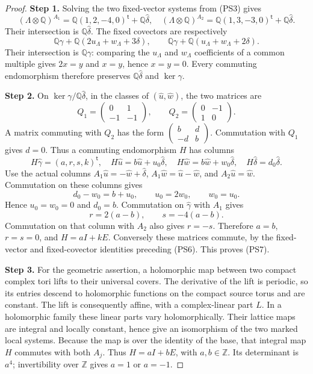 \begin{proof}
\par\smallskip\noindent\textbf{Step 1.} Solving the two fixed-vector systems from (PS3) gives
\[
 (\Lambda\otimes\mathbb Q)^{A_1}
   =\mathbb Q(1,2,-4,0)^{\mathsf t}+\mathbb Q\widehat\delta,
 \quad
 (\Lambda\otimes\mathbb Q)^{A_2}
   =\mathbb Q(1,3,-3,0)^{\mathsf t}+\mathbb Q\widehat\delta.
\]
Their intersection is $\mathbb Q\widehat\delta$. The fixed covectors
are respectively
\[
 \mathbb Q\gamma+\mathbb Q(2u_{\Lambda}+w_{\Lambda}+3\delta),\qquad
 \mathbb Q\gamma+\mathbb Q(u_{\Lambda}+w_{\Lambda}+2\delta).
\]
Their intersection is $\mathbb Q\gamma$: comparing the $u_{\Lambda}$ and $w_{\Lambda}$
coefficients of a common multiple gives $2x=y$ and $x=y$, hence
$x=y=0$. Every commuting endomorphism therefore preserves
$\mathbb Q\widehat\delta$ and $\ker\gamma$.

\par\smallskip\noindent\textbf{Step 2.} On $\ker\gamma/\mathbb Q\widehat\delta$, in the classes of
$(\widehat u,\widehat w)$, the two matrices are
\[
 Q_1=\begin{pmatrix}0&1\\-1&-1\end{pmatrix},\qquad
 Q_2=\begin{pmatrix}0&-1\\1&0\end{pmatrix}.
\]
A matrix commuting with $Q_2$ has the form
$\left(\begin{smallmatrix}b&d\\-d&b\end{smallmatrix}\right)$.
Commutation with $Q_1$ gives $d=0$. Thus a commuting endomorphism $H$
has columns
\[
 H\widehat\gamma=(a,r,s,k)^{\mathsf t},\quad
 H\widehat u=b\widehat u+u_0\widehat\delta,\quad
 H\widehat w=b\widehat w+w_0\widehat\delta,\quad
 H\widehat\delta=d_0\widehat\delta.
\]
Use the actual columns $A_1\widehat u=-\widehat w+\widehat\delta$,
$A_1\widehat w=\widehat u-\widehat w$, and
$A_2\widehat u=\widehat w$. Commutation on these columns gives
\[
 d_0-w_0=b+u_0,\qquad u_0=2w_0,\qquad w_0=u_0.
\]
Hence $u_0=w_0=0$ and $d_0=b$. Commutation on
$\widehat\gamma$ with $A_1$ gives
\[
 r=2(a-b),\qquad s=-4(a-b).
\]
Commutation on that column with $A_2$ also gives $r=-s$.
Therefore $a=b$, $r=s=0$, and $H=aI+kE$. Conversely these matrices
commute, by the fixed-vector and fixed-covector identities preceding
(PS6). This proves (PS7).

\par\smallskip\noindent\textbf{Step 3.} For the geometric assertion, a holomorphic map between two compact
complex tori lifts to their universal covers. The derivative of the
lift is periodic, so its entries descend to holomorphic functions on
the compact source torus and are constant. The lift is consequently
affine, with a complex-linear part $L$. In a holomorphic family these
linear parts vary holomorphically. Their lattice maps are integral
and locally constant, hence give an isomorphism of the two marked
local systems. Because the map is over the identity of the base,
that integral map $H$ commutes with both $A_j$. Thus
$H=aI+bE$, with $a,b\in\mathbb Z$. Its determinant is $a^4$;
invertibility over $\mathbb Z$ gives $a=1$ or $a=-1$.


\end{proof}
